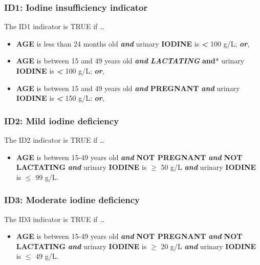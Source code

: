 \documentclass[12pt,a4paper]{article}
\providecommand{\tightlist}{%
  \setlength{\itemsep}{0pt}\setlength{\parskip}{0pt}}
\begin{document}
\hypertarget{id1-iodine-insufficiency-indicator}{%
\subsubsection{ID1: Iodine insufficiency indicator}\label{id1-iodine-insufficiency-indicator}}

The ID1 indicator is TRUE if \ldots{}

\begin{itemize}
\item
  \textbf{AGE} is less than 24 months old \textbf{\emph{and}} urinary \textbf{IODINE} is \textbf{\emph{\textless{}}} 100 g/L; \textbf{\emph{or}},
\item
  \textbf{AGE} is between 15 and 49 years old \emph{\textbf{and} \textbf{LACTATING} }\textbf{and}* urinary \textbf{IODINE} is \textbf{\emph{\textless{}}} 100 g/L; \textbf{\emph{or}},
\item
  \textbf{AGE} is between 15 and 49 years old \textbf{\emph{and}} \textbf{PREGNANT} \textbf{\emph{and}} urinary \textbf{IODINE} is \textbf{\emph{\textless{}}} 150 g/L; \textbf{\emph{or}},
\end{itemize}

\hypertarget{id2-mild-iodine-deficiency}{%
\subsubsection{ID2: Mild iodine deficiency}\label{id2-mild-iodine-deficiency}}

The ID2 indicator is TRUE if \ldots{}

\begin{itemize}
\tightlist
\item
  \textbf{AGE} is between 15-49 years old \textbf{\emph{and}} \textbf{NOT PREGNANT} \textbf{\emph{and}} \textbf{NOT LACTATING} \textbf{\emph{and}} urinary \textbf{IODINE} is \textbf{\emph{\(\geq\)}} 50 g/L \textbf{\emph{and}} urinary \textbf{IODINE} is \textbf{\emph{\(\leq\)}} 99 g/L.
\end{itemize}

\hypertarget{id3-moderate-iodine-deficiency}{%
\subsubsection{ID3: Moderate iodine deficiency}\label{id3-moderate-iodine-deficiency}}

The ID3 indicator is TRUE if \ldots{}

\begin{itemize}
\tightlist
\item
  \textbf{AGE} is between 15-49 years old \textbf{\emph{and}} \textbf{NOT PREGNANT} \textbf{\emph{and}} \textbf{NOT LACTATING} \textbf{\emph{and}} urinary \textbf{IODINE} is \textbf{\emph{\(\geq\)}} 20 g/L \textbf{\emph{and}} urinary \textbf{IODINE} is \textbf{\emph{\(\leq\)}} 49 g/L.
\end{itemize}
\end{document}
